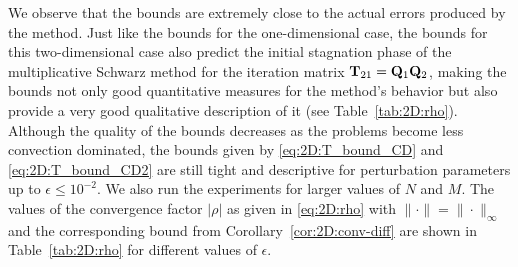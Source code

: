 We observe that the bounds are extremely close to the actual errors
produced by the method. Just like the bounds for the one-dimensional case, the
bounds for this two-dimensional case also predict the initial stagnation phase
of the multiplicative Schwarz method for the iteration matrix
$\mathbf{T}_{21}=\mathbf{Q}_1\mathbf{Q}_2$, making the bounds not only good quantitative measures for
the method's behavior but also provide a very good qualitative description of
it (see Table~\ref{tab:2D:rho}). Although the quality of the bounds decreases
as the problems become less convection dominated, the bounds given by
\eqref{eq:2D:T_bound_CD} and \eqref{eq:2D:T_bound_CD2} are still tight and
descriptive for perturbation parameters up to $\epsilon\leq10^{-2}$. We also
run the experiments for larger values of $N$ and $M$. The values of the
convergence factor $|\rho|$ as given in \eqref{eq:2D:rho} with
$\|\cdot\|=\|\cdot\|_{\infty}$ and the corresponding bound from
Corollary~\ref{cor:2D:conv-diff} are shown in
Table~\ref{tab:2D:rho} for different values of $\epsilon$.
%
%

